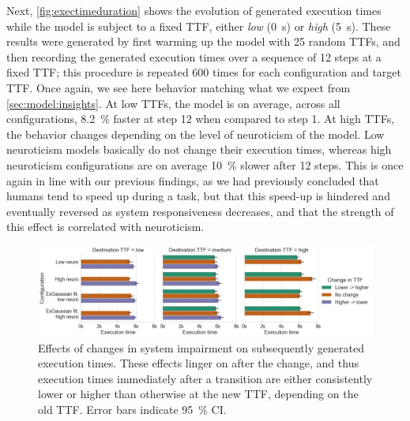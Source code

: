 Next, \cref{fig:exectimeduration} shows the evolution of generated execution times while the model is subject to a fixed \gls{TTF}, either \emph{low} (\SI{0}{\second}) or \emph{high} (\SI{5}{\second}).
These results were generated by first warming up the model with \num{25} random \glspl{TTF}, and then recording the generated execution times over a sequence of \num{12} steps at a fixed \gls{TTF}; this procedure is repeated \num{600} times for each configuration and target \gls{TTF}.
Once again, we see here behavior matching what we expect from \cref{sec:model:insights}.
At low \glspl{TTF}, the model is on average, across all configurations, \SI{8.2}{\percent} faster at step \num{12} when compared to step \num{1}.
At high \glspl{TTF}, the behavior changes depending on the level of neuroticism of the model.
Low neuroticism models basically do not change their execution times, whereas high neuroticism configurations are on average \SI{10}{\percent} slower after \num{12} steps.
This is once again in line with our previous findings, as we had previously concluded that humans tend to speed up during a task, but that this speed-up is hindered and eventually reversed as system responsiveness decreases, and that the strength of this effect is correlated with neuroticism.

\begin{figure}
    \centering
    \includegraphics[width=\textwidth]{figs/new_model/transitions}
    \caption{%
        Effects of changes in system impairment on subsequently generated execution times.
        These effects linger on after the change, and thus execution times immediately after a transition are either consistently lower or higher than otherwise at the new \gls{TTF}, depending on the old \gls{TTF}.
        Error bars indicate \SI{95}{\percent} \gls{CI}.
    }\label{fig:transitions}
\end{figure}

